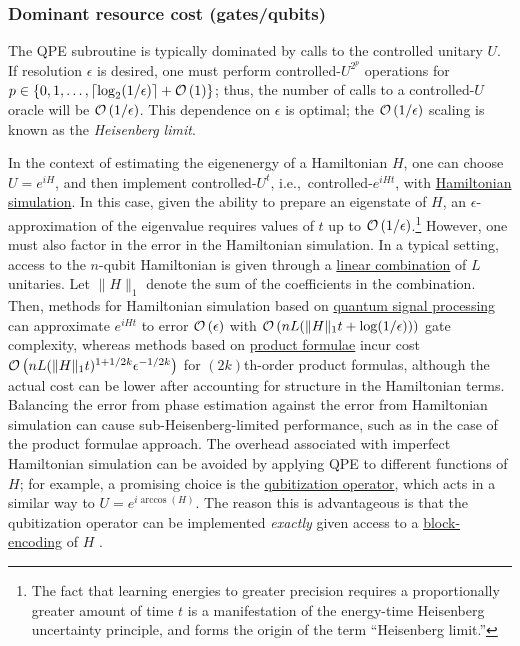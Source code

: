 \begin{refsection}

\subsubsection*{Dominant resource cost (gates/qubits)}

The QPE subroutine is typically dominated by calls to the controlled unitary $U$.   If resolution $\epsilon$ is desired, one must perform controlled-$U^{2^p}$ operations for $p\in \{0,1,\ldots, \lceil \log_2(1/\epsilon) \rceil + \mathcal{O}\left( 1 \right)\}$; thus, the number of calls to a controlled-$U$ oracle will be $\mathcal{O}\left( 1/\epsilon \right)$. This dependence on $\epsilon$ is optimal; the $\mathcal{O}\left( 1/\epsilon \right)$ scaling is known as the \emph{Heisenberg limit}. 

In the context of estimating the eigenenergy of a Hamiltonian $H$, one can choose $U = e^{iH}$, and then implement controlled-$U^t$, i.e.,~controlled-$e^{iHt}$, with \hyperref[prim:HamiltonianSimulation]{Hamiltonian simulation}. In this case, given the ability to prepare an eigenstate of $H$, an $\epsilon$-approximation of the eigenvalue requires values of $t$ up to $\mathcal{O}\left( 1/\epsilon \right)$.\footnote{The fact that learning energies to greater precision requires a proportionally greater amount of time $t$ is a manifestation of the energy-time Heisenberg uncertainty principle, and forms the origin of the term ``Heisenberg limit.''}  However, one must also factor in the error in the Hamiltonian simulation. In a typical setting,  access to the $n$-qubit Hamiltonian is given through a \hyperref[prim:LCU]{linear combination} of $L$ unitaries. Let $\lVert H \rVert_1$ denote the sum of the coefficients in the combination. Then, methods for Hamiltonian simulation based on \hyperref[prim:QSPqubitization]{quantum signal processing} can approximate $e^{iHt}$ to error $\mathcal{O}\left( \epsilon \right)$ with $\mathcal{O}\left( nL(\lVert H \rVert_1 t + \log(1/\epsilon)) \right)$ 
gate complexity, whereas methods based on \hyperref[prim:ProductFormulae]{product formulae} incur cost $\mathcal{O}\left( nL(\lVert H \rVert_1 t)^{1+1/2k}\epsilon^{-1/2k} \right)$ for $(2k)$th-order product formulas, although the actual cost can be lower after accounting for structure in the Hamiltonian terms. Balancing the error from phase estimation against the error from Hamiltonian simulation can cause sub-Heisenberg-limited performance, such as in the case of the product formulae approach. The overhead associated with imperfect Hamiltonian simulation can be avoided by applying QPE to different functions of $H$; for example, a promising choice is the \hyperref[prim:Qubitization]{qubitization operator}, which acts in a similar way to $U = e^{i \arccos(H)}$.  The reason this is advantageous is that the qubitization operator can be implemented \emph{exactly} given access to a \hyperref[prim:BlockEncodings]{block-encoding} of $H$ \cite{low2016HamSimQubitization, poulin2018SpectralQubitization,berry2018ImprovedEigenstatesFermionic}. 


\end{refsection}
